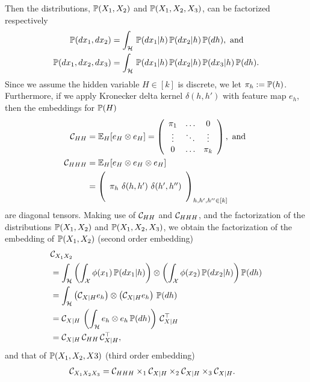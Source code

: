 \documentclass{article}
\begin{document}
Then the distributions, $\mathbb{P}(X_1,X_2)$ and $\mathbb{P}(X_1,X_2,X_3)$, can be factorized respectively
\begin{align*}
	\mathbb{P}(dx_1, dx_2) &= \int_{\mathcal{H}}\, \mathbb{P}(dx_1 | h )\, \mathbb{P}(d x_2 | h)\, \mathbb{P}(dh),~\text{and}\\
	\mathbb{P}(dx_1, dx_2, dx_3) &= \int_{\mathcal{H}}\, \mathbb{P}(dx_1 | h )\, \mathbb{P}(dx_2 | h)\, \mathbb{P}(dx_3 | h)\, \mathbb{P}(dh).
\end{align*}
Since we assume the hidden variable $H \in [k]$ is discrete,
we let $\pi_h:=\mathbb{P}(h)$. Furthermore, if we apply Kronecker delta kernel $\delta(h,h')$ with feature map $e_h$, then the embeddings for $\mathbb{P}(H)$
\begin{align*}
 \mathcal{C}_{HH} &= \mathbb{E}_H[e_H \otimes e_H] = \left(
  \begin{array}{ccc}
    \pi_1& \ldots & 0 \cr
    \vdots & \ddots & \vdots \cr
    0 & \ldots & \pi_k
  \end{array}
 \right),
 ~\text{and}~\\
 \mathcal{C}_{HHH} &= \mathbb{E}_H[e_H \otimes e_H \otimes e_H]  \\
	&= \left(
  \begin{array}{c}
    \cr
    \pi_h\ \delta(h,h')\ \delta(h',h'') \cr
    \cr
  \end{array}
 \right)_{h,h',h''\in[k]}
\end{align*}
are diagonal tensors. Making use of $\mathcal{C}_{HH}$ and $\mathcal{C}_{HHH}$, and the factorization of the distributions $\mathbb{P}(X_1,X_2)$ and $\mathbb{P}(X_1,X_2,X_3)$, we obtain the factorization of the embedding of
$\mathbb{P}(X_1,X_2)$ (second order embedding)
\begin{align}
  &\mathcal{C}_{X_1X_2} \nonumber \\
  &= \int_{\mathcal{H}} \left(\int_{\mathcal{X}} \phi(x_1)\, \mathbb{P}(dx_1|h)\right) \otimes \left(\int_{\mathcal{X}} \phi(x_2)\, \mathbb{P}(dx_2 |h)\right) \mathbb{P}(dh) \nonumber \\
  &= \int_{\mathcal{H}} \left(\mathcal{C}_{X|H} e_h\right) \otimes \left(\mathcal{C}_{X|H} e_h\right)\, \mathbb{P}(dh) \nonumber \\
  &= \mathcal{C}_{X|H}\, \left(\int_{\mathcal{H}} e_h \otimes e_h\, \mathbb{P}(dh)\right)\, \mathcal{C}_{X|H}^\top \nonumber \\
  &= \mathcal{C}_{X|H}\, \mathcal{C}_{HH}\, \mathcal{C}_{X|H}^\top, \label{eq:pair_factorization}
\end{align}
and that of $\mathbb{P}(X_1,X_2,X3)$ (third order embedding)
\begin{align}
  &\mathcal{C}_{X_1 X_2 X_3}
  = \mathcal{C}_{HHH} \times_1 \mathcal{C}_{X|H} \times_2 \mathcal{C}_{X|H} \times_3 \mathcal{C}_{X|H}. \label{eq:triple_factorization}
\end{align}
\end{document}
